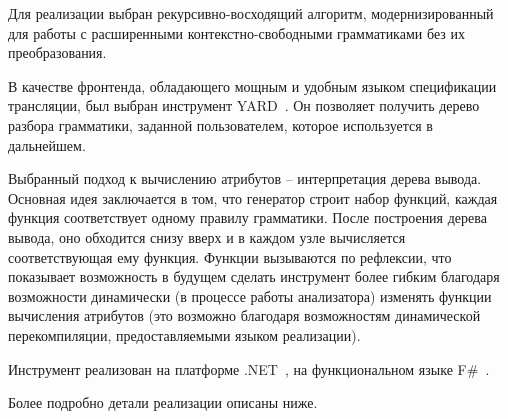
Для реализации выбран рекурсивно-восходящий алгоритм, модернизированный для работы с расширенными контекстно-свободными грамматиками без их преобразования.

В качестве фронтенда, обладающего мощным и удобным языком спецификации трансляции, был выбран инструмент YARD~\cite{Diploma}. Он позволяет получить дерево разбора грамматики, заданной пользователем, которое используется в дальнейшем.%

Выбранный подход к вычислению атрибутов -- интерпретация дерева вывода. Основная идея заключается в том, что генератор строит набор функций, каждая функция соответствует одному правилу грамматики. После построения дерева вывода, оно обходится снизу вверх и в каждом узле вычисляется соответствующая ему функция. Функции вызываются по рефлексии, что показывает возможность в будущем сделать инструмент более гибким благодаря возможности динамически (в процессе работы анализатора) изменять функции вычисления атрибутов (это возможно благодаря возможностям динамической перекомпиляции, предоставляемыми языком реализации).

Инструмент реализован на платформе .NET~\cite{.NET}, на функциональном языке F\#~\cite{FS}.

Более подробно детали реализации описаны ниже.
